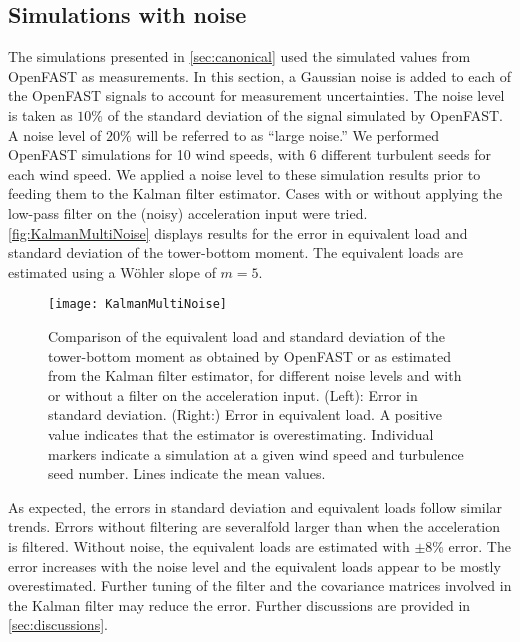 \documentclass[wes, manuscript]{copernicus}
\begin{document}
\subsection{Simulations with noise}
\label{sec:NoiseAndFilter}
The simulations presented in \autoref{sec:canonical} used the simulated values from OpenFAST as measurements. In this section, a Gaussian noise is added to each of the OpenFAST signals to account for measurement uncertainties. The noise level is taken as $10$\% of the standard deviation of the signal simulated by OpenFAST. A noise level of $20\%$ will be referred to as ``large noise.''
We performed OpenFAST simulations for 10 wind speeds, with 6 different turbulent seeds for each wind speed. We applied a noise level to these simulation results prior to feeding them to the Kalman filter estimator. Cases with or without applying the low-pass filter on the (noisy) acceleration input were tried. 
\autoref{fig:KalmanMultiNoise} displays results for the error in equivalent load and standard deviation of the tower-bottom moment. The equivalent loads are estimated using a W{\"o}hler slope of $m=5$.
%
\noindent\begin{figure}[!htb]\centering%
  \texttt{[image: KalmanMultiNoise]}
  \caption{Comparison of the equivalent load and standard deviation of the tower-bottom moment as obtained by OpenFAST or as estimated from the Kalman filter estimator, for different noise levels and with or without a filter on the acceleration input. (Left): Error in standard deviation. (Right:) Error in equivalent load. A positive value indicates that the estimator is overestimating. Individual markers indicate a simulation at a given wind speed and turbulence seed number. Lines indicate the mean values.}\label{fig:KalmanMultiNoise}%
\end{figure}
%
As expected, the errors in standard deviation and equivalent loads follow similar trends. Errors without filtering are severalfold larger than when the acceleration is filtered.
Without noise, the equivalent loads are estimated with $\pm8$\% error. The error increases with the noise level and the equivalent loads appear to be mostly overestimated. Further tuning of the filter and the covariance matrices involved in the Kalman filter may reduce the error. Further discussions are provided in \autoref{sec:discussions}.
\end{document}

